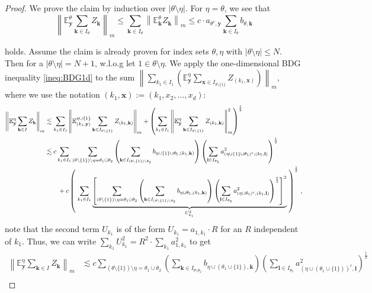 \documentclass[11pt,oneside,english,reqno]{amsart}
\numberwithin{equation}{section}
\numberwithin{figure}{section}
\theoremstyle{plain}
\theoremstyle{definition}
\theoremstyle{remark}
\theoremstyle{plain}
\theoremstyle{plain}
\theoremstyle{plain}
\theoremstyle{plain}
\theoremstyle{plain}
\newcommand{\EE}{\mathbb{E}}
\newcommand{\bk}{\mathbf{k}}
\newcommand{\bl}{\mathbf l}
\newcommand{\bx}{\mathbf{x}}
\newcommand{\by}{\mathbf{y}}
\newcommand{\norm}[1]{\left\lVert #1\right\rVert}
\newcommand{\abs}[1]{\left\lvert #1\right\rvert}
\begin{document}
%
\begin{proof}
    We prove the claim by induction over $\abs{\theta\setminus\eta}$. For $\eta = \theta$, we see that
%
    \begin{equation*}
        \norm{\EE^\theta_{\mathbf y} \sum_{\bk\in I_\theta} Z_\bk}_m \le \sum_{\bk\in I_\theta}\norm{\EE^\theta_{\bk} Z_\bk}_m\le c\cdot a_{\theta^c,\by}\sum_{\bk\in I_\theta} b_{\theta,\bk}
    \end{equation*}

    \noindent holds. Assume the claim is already proven for index sets $\theta, \eta$ with $\abs{\theta\setminus\eta}\le N$. Then for a $\abs{\theta\setminus\eta} = N+1$, w.l.o.g let $1\in\theta\setminus\eta$. We apply the one-dimensional BDG inequality \eqref{ineq:BDG1d} to the sum $\norm{\sum_{k_1\in I_1}\left(\EE^\eta_\by\sum_{\bx\in I_{\theta\setminus\{1\}}} Z_{(k_1,\bx)}\right)}_m$, where we use the notation $(k_1,\bx) := (k_1,x_2,\dots,x_d)$:
%
    \begin{align*}
        \norm{\EE^\eta_{\mathbf y} \sum_{\bk\in I} Z_\bk}_m&\lesssim \sum_{k_1\in I_1}\norm{\EE_{(k_1,\mathbf y)}^{\eta\cup\{1\}}\sum_{\bk\in I_{\theta\setminus\{1\}}} Z_{(k_1,\bk)}}_m+ \left(\sum_{k_1\in I_1} \norm{\EE_{\mathbf y}^{\eta}\sum_{\bk\in I_{\theta\setminus\{1\}}} Z_{(k_1,\bk)}}_m^2\right)^{\frac 12}\\
        &\lesssim c\sum_{k_1\in I_1}\sum_{(\theta\setminus\{1\})\setminus\eta = \theta_1\dot\cup\theta_2} \left(\sum_{\bk\in I_{(\theta\setminus\{1\})\setminus\theta_2}} b_{\eta\cup\{1\}\cup\theta_1,(k_1,\bk)}\right)\left(\sum_{\bl\in I_{\theta_2}} a_{(\eta\cup\{1\}\cup\theta_1)^c,(k_1,\bl)}^2\right)^{\frac 12} \\
        &\qquad + c\left(\rule{0cm}{1.3cm}\right. \sum_{k_1\in I_1}\underbrace{\left[\sum_{(\theta\setminus\{1\})\setminus\eta = \theta_1\dot\cup\theta_2} \left(\sum_{\bk\in I_{(\theta\setminus\{1\})\setminus\theta_2}} b_{\eta\cup\theta_1,(k_1,\bk)}\right)\left(\sum_{\bl\in I_{\theta_2}} a_{(\eta\cup\theta_1)^c,(k_1,\bl)}^2\right)^{\frac 12}\right]^2}_{U_{k_1}^2}\left.\rule{0cm}{1.3cm}\right)^{\frac 12}\,,
    \end{align*}
%
    note that the second term $U_{k_1}$ is of the form $U_{k_1} = a_{1,k_1}\cdot R$ for an $R$ independent of $k_1$. Thus, we can write $\sum_{k_1} U_{k_1}^2 = R^2\cdot\sum_{k_1}a_{1,k_1}^2$ to get
%
    \begin{align*}
        \norm{\EE^\eta_{\mathbf y} \sum_{\bk\in I} Z_\bk}_m&\lesssim c\sum_{(\theta\setminus\{1\})\setminus\eta = \theta_1\dot\cup\theta_2} \left(\sum_{\bk\in I_{\theta\setminus\theta_2}} b_{\eta\cup(\theta_1\cup\{1\}),\bk}\right)\left(\sum_{\bl\in I_{\theta_2}} a_{(\eta\cup(\theta_1\cup\{1\}))^c,\bl}^2\right)^{\frac 12} \\

\end{align*}
\end{proof}
\end{document}
